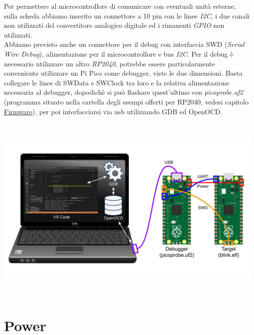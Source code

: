 Per permettere al microcontrollore di comunicare con eventuali unità
esterne, sulla scheda abbiamo inserito un connettore a 10 pin con le
linee \emph{I2C}, i due canali non utilizzati del convertitore analogico
digitale ed i rimanenti \emph{GPIO} non utilizzati.\\
Abbiamo previsto anche un connettore per il debug con interfaccia SWD
(\emph{Serial Wire Debug}), alimentazione per il microcontrollore e bus
\emph{I2C}. Per il debug è necessario utilizzare un altro \emph{RP2040},
potrebbe essere particolarmente conveniente utilizzare un Pi Pico come
debugger, viste le due dimensioni. Basta collegare le linee di SWData e
SWClock tra loro e la relativa alimentazione necessaria al debugger,
dopodichè si può flashare quest'ultimo con \emph{picoprobe.uf2}
(programma situato nella cartella degli esempi offerti per RP2040,
vedesi capitolo
\protect\hyperlink{_w8kvxnysumpc}{\underline{Firmware}}), per poi
interfacciarsi via usb utilizzando GDB ed OpenOCD.

\begin{center}
\includegraphics[width=6.5in,height=3.65278in]{figures/image18.png}
\captionsetup{type=figure}
\end{center}

\hypertarget{power}{%
\section{Power}\label{power}}

